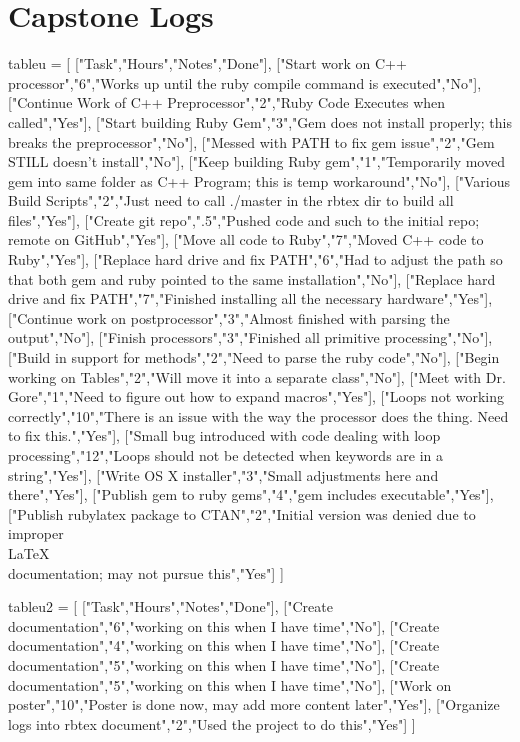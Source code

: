 \documentclass{hw}
\begin{document}
\section*{Capstone Logs}
\begin{rbtex}
tableu = [
    ["Task","Hours","Notes","Done"],
    ["Start work on C++ processor","6","Works up until the ruby compile command is executed","No"],
    ["Continue Work of C++ Preprocessor","2","Ruby Code Executes when called","Yes"],
    ["Start building Ruby Gem","3","Gem does not install properly; this breaks the preprocessor","No"],
    ["Messed with PATH to fix gem issue","2","Gem STILL doesn't install","No"],
    ["Keep building Ruby gem","1","Temporarily moved gem into same folder as C++ Program; this is temp workaround","No"],
    ["Various Build Scripts","2","Just need to call ./master in the rbtex dir to build all files","Yes"],
    ["Create git repo",".5","Pushed code and such to the initial repo; remote on GitHub","Yes"],
    ["Move all code to Ruby","7","Moved C++ code to Ruby","Yes"],
    ["Replace hard drive and fix PATH","6","Had to adjust the path so that both gem and ruby pointed to the same installation","No"],
    ["Replace hard drive and fix PATH","7","Finished installing all the necessary hardware","Yes"],
    ["Continue work on postprocessor","3","Almost finished with parsing the output","No"],
    ["Finish processors","3","Finished all primitive processing","No"],
    ["Build in support for methods","2","Need to parse the ruby code","No"],
    ["Begin working on Tables","2","Will move it into a separate class","No"],
    ["Meet with Dr. Gore","1","Need to figure out how to expand macros","Yes"],
    ["Loops not working correctly","10","There is an issue with the way the processor does the thing. Need to fix this.","Yes"],
    ["Small bug introduced with code dealing with loop processing","12","Loops should not be detected when keywords are in a string","Yes"],
    ["Write OS X installer","3","Small adjustments here and there","Yes"],
    ["Publish gem to ruby gems","4","gem includes executable","Yes"],
    ["Publish rubylatex package to CTAN","2","Initial version was denied due to improper \\LaTeX\\ documentation; may not pursue this","Yes"]
]

tableu2 = [
    ["Task","Hours","Notes","Done"],
    ["Create documentation","6","working on this when I have time","No"],
    ["Create documentation","4","working on this when I have time","No"],
    ["Create documentation","5","working on this when I have time","No"],
    ["Create documentation","5","working on this when I have time","No"],
    ["Work on poster","10","Poster is done now, may add more content later","Yes"],
    ["Organize logs into rbtex document","2","Used the project to do this","Yes"]
]


\end{rbtex}
\end{document}
